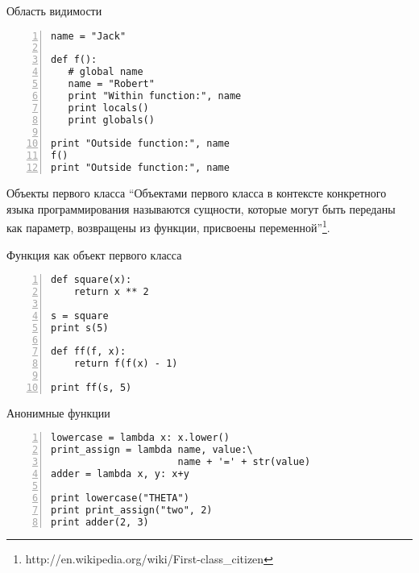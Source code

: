 \documentclass[hyperref={pdftex,unicode}]{beamer}
\begin{document}
\begin{frame}[fragile]{Область видимости}
  \begin{lstlisting}[numbers=left]
name = "Jack"

def f():
   # global name 
   name = "Robert"
   print "Within function:", name
   print locals()
   print globals()

print "Outside function:", name
f()
print "Outside function:", name
\end{lstlisting}
\end{frame}

\begin{frame}{Объекты первого класса}
  ``Объектами первого класса в контексте конкретного языка программирования называются сущности,
  которые могут быть переданы как параметр, возвращены из функции, присвоены переменной''\footnote[frame]{
    http://en.wikipedia.org/wiki/First-class\_citizen}.
\end{frame}

\begin{frame}[fragile]{Функция как объект первого класса}
  \begin{lstlisting}[numbers=left]
def square(x):
    return x ** 2

s = square
print s(5)

def ff(f, x):
    return f(f(x) - 1)

print ff(s, 5)
\end{lstlisting}
\end{frame}

\begin{frame}[fragile]{Анонимные функции}
  \begin{lstlisting}[numbers=left]
lowercase = lambda x: x.lower()
print_assign = lambda name, value:\
                      name + '=' + str(value)
adder = lambda x, y: x+y

print lowercase("THETA")
print print_assign("two", 2)
print adder(2, 3)
\end{lstlisting}
\end{frame}
\end{document}

